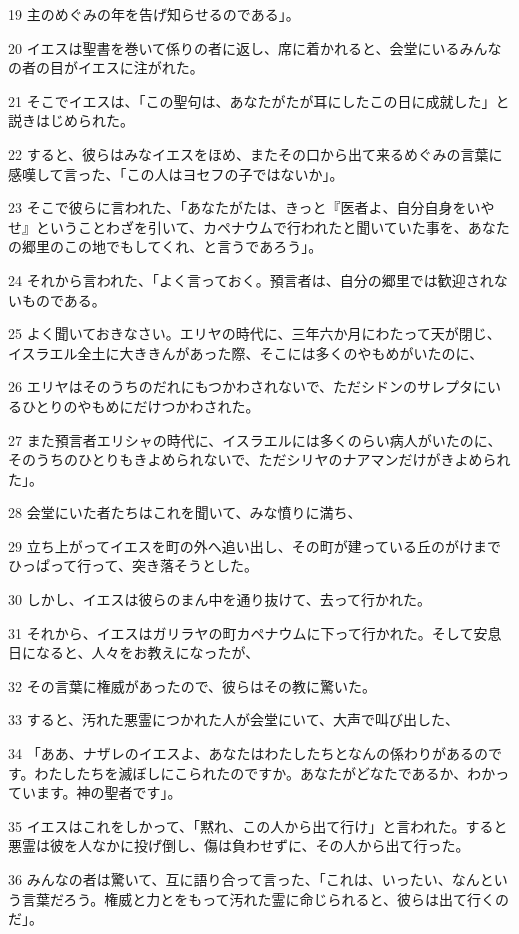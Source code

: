 \par 19 主のめぐみの年を告げ知らせるのである」。
\par 20 イエスは聖書を巻いて係りの者に返し、席に着かれると、会堂にいるみんなの者の目がイエスに注がれた。
\par 21 そこでイエスは、「この聖句は、あなたがたが耳にしたこの日に成就した」と説きはじめられた。
\par 22 すると、彼らはみなイエスをほめ、またその口から出て来るめぐみの言葉に感嘆して言った、「この人はヨセフの子ではないか」。
\par 23 そこで彼らに言われた、「あなたがたは、きっと『医者よ、自分自身をいやせ』ということわざを引いて、カペナウムで行われたと聞いていた事を、あなたの郷里のこの地でもしてくれ、と言うであろう」。
\par 24 それから言われた、「よく言っておく。預言者は、自分の郷里では歓迎されないものである。
\par 25 よく聞いておきなさい。エリヤの時代に、三年六か月にわたって天が閉じ、イスラエル全土に大ききんがあった際、そこには多くのやもめがいたのに、
\par 26 エリヤはそのうちのだれにもつかわされないで、ただシドンのサレプタにいるひとりのやもめにだけつかわされた。
\par 27 また預言者エリシャの時代に、イスラエルには多くのらい病人がいたのに、そのうちのひとりもきよめられないで、ただシリヤのナアマンだけがきよめられた」。
\par 28 会堂にいた者たちはこれを聞いて、みな憤りに満ち、
\par 29 立ち上がってイエスを町の外へ追い出し、その町が建っている丘のがけまでひっぱって行って、突き落そうとした。
\par 30 しかし、イエスは彼らのまん中を通り抜けて、去って行かれた。
\par 31 それから、イエスはガリラヤの町カペナウムに下って行かれた。そして安息日になると、人々をお教えになったが、
\par 32 その言葉に権威があったので、彼らはその教に驚いた。
\par 33 すると、汚れた悪霊につかれた人が会堂にいて、大声で叫び出した、
\par 34 「ああ、ナザレのイエスよ、あなたはわたしたちとなんの係わりがあるのです。わたしたちを滅ぼしにこられたのですか。あなたがどなたであるか、わかっています。神の聖者です」。
\par 35 イエスはこれをしかって、「黙れ、この人から出て行け」と言われた。すると悪霊は彼を人なかに投げ倒し、傷は負わせずに、その人から出て行った。
\par 36 みんなの者は驚いて、互に語り合って言った、「これは、いったい、なんという言葉だろう。権威と力とをもって汚れた霊に命じられると、彼らは出て行くのだ」。
